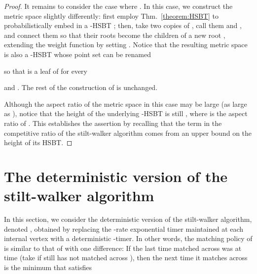 \documentclass[11pt]{article}
\def\LongVersion{}
\def\LongVersionEnd{}
\theoremstyle{definition}
\theoremstyle{plain}
\theoremstyle{definition}
\theoremstyle{plain}
\theoremstyle{definition}
\theoremstyle{plain}
\newcommand{\Thm}{Thm.}
\begin{document}
\begin{proof}
It remains to consider the case where
.
In this case, we construct the metric space  slightly
differently:
first employ \Thm{}~\ref{theorem:HSBT} to probabilistically embed
 in a -HSBT ;
then, take two copies of , call them  and , and connect them
so that their roots become the children of a new root , extending
the weight function  by setting
.
Notice that the resulting metric space is also a -HSBT whose point set can be renamed

so that  is a leaf of  for every

and
.
The rest of the construction of  is unchanged.

Although the aspect ratio of the metric space  in this
case may be large (as large as
),
notice that the height of the underlying -HSBT is
still ,
where  is the aspect ratio of .
This establishes the assertion by recalling that the  term in the
competitive ratio of the stilt-walker algorithm comes from an upper bound on
the height of its HSBT.
\end{proof}
\LongVersionEnd 

\LongVersion \section{The deterministic version of the stilt-walker algorithm}
\label{section:specific-lower-bound}
In this section, we consider the deterministic version of the stilt-walker
algorithm, denoted , obtained by replacing the -rate
exponential timer maintained at each internal vertex  with
a deterministic -timer.
In other words, the matching policy of  is similar to that of 
with one difference:
If the last time  matched across  was at time 
(take  if  still has not matched across ), then the next
time it matches across  is the minimum  that satisfies
\end{document}
